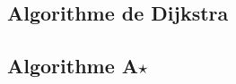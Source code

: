 \subsection{Algorithme de Dijkstra}

\subsection{Algorithme A$\star$}

\begin{defi}{}
\end{defi}

\begin{defi}{}
\end{defi}

\begin{defi}{}
\end{defi}

\begin{defi}{}
\end{defi}

\begin{defi}{}
\end{defi}
